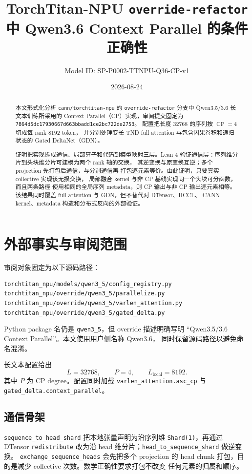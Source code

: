 \documentclass[11pt,a4paper]{ctexart}
\title{TorchTitan-NPU \texttt{override-refactor} 中 Qwen3.6 Context Parallel 的条件正确性}
\author{Model ID: SP-P0002-TTNPU-Q36-CP-v1}
\date{2026-08-24}
\newcommand{\CP}{\operatorname{CP}}
\begin{document}
\maketitle

\begin{abstract}
本文形式化分析 \texttt{cann/torchtitan-npu} 的
\texttt{override-refactor} 分支中 Qwen3.5/3.6 长文本训练所采用的
Context Parallel（CP）实现，审阅提交固定为
\texttt{7864d5dc17930667d663bbadd1ce2bc722de2753}。
配置把长度 $32768$ 的序列按 $\CP=4$ 切成每 rank $8192$ token，
并分别处理变长 TND full attention 与包含因果卷积和递归状态的
Gated DeltaNet（GDN）。

证明把实现拆成通信、局部算子和代码到模型映射三层。Lean 4
验证通信层：序列维分片到头块维分片可建模为两个 rank 轴的交换，
其逆变换与原变换互逆；多个 projection 先打包后通信，与分别通信再
打包逐元素等价。由此证明，只要真实 collective 实现该无损交换，
局部融合 kernel 与非 CP 基线实现同一个头块可分函数，而且两条路径
使用相同的全局序列 metadata，则 CP 输出与非 CP 输出逐元素相等。
该结果同时覆盖 full attention 与 GDN，但不替代对 DTensor、HCCL、
CANN kernel、metadata 构造和分布式反向的外部验证。
\end{abstract}

\section{外部事实与审阅范围}

审阅对象固定为以下源码路径：
\begin{verbatim}
torchtitan_npu/models/qwen3_5/config_registry.py
torchtitan_npu/override/qwen3_5/parallelize.py
torchtitan_npu/override/qwen3_5/varlen_attention.py
torchtitan_npu/override/qwen3_5/gated_delta.py
\end{verbatim}
Python package 名仍是 \texttt{qwen3\_5}，但 override 描述明确写明
``Qwen3.5/3.6 Context Parallel''。本文使用用户侧名称 Qwen3.6，
同时保留源码路径以避免命名混淆。

长文本配置给出
\[
L=32768,\qquad P=4,\qquad L_{\mathrm{local}}=8192.
\]
其中 $P$ 为 CP degree。配置同时加载
\texttt{varlen\_attention.asc\_cp} 与
\texttt{gated\_delta.context\_parallel}。

\subsection{通信骨架}

\texttt{sequence\_to\_head\_shard} 把本地张量声明为沿序列维
\texttt{Shard(1)}，再通过 DTensor \texttt{redistribute} 改为沿
head 维分片；\texttt{head\_to\_sequence\_shard} 做逆变换。
\texttt{exchange\_sequence\_heads} 会先把多个 projection 的 head
chunk 打包，目的是减少 collective 次数。数学正确性要求打包不改变
任何元素的归属和顺序。
\end{document}
